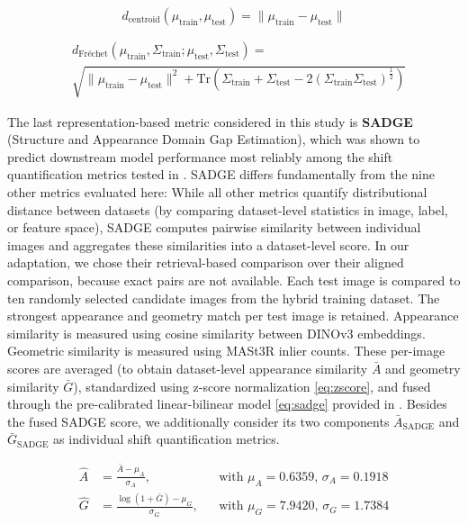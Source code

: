 \documentclass[conference]{IEEEtran}
\begin{document}
\begin{equation}
\label{eq:centroid}
d_{\text{centroid}}(\mu_{\text{train}},\mu_{\text{test}}) = \|\mu_{\text{train}} - \mu_{\text{test}}\|
\end{equation}

\begin{equation}
\label{eq:frechet}
\begin{aligned}
&d_{\text{Fréchet}}(\mu_{\text{train}},\Sigma_{\text{train}};\mu_{\text{test}},\Sigma_{\text{test}}) = \\
&\sqrt{
\|\mu_{\text{train}} - \mu_{\text{test}}\|^2
+ \mathrm{Tr}\!\left(\Sigma_{\text{train}} + \Sigma_{\text{test}} - 2(\Sigma_{\text{train}} \Sigma_{\text{test}})^{\frac{1}{2}}\right)
}
\end{aligned}
\end{equation}

\smallskip
The last representation-based metric considered in this study is \textbf{SADGE} (Structure and Appearance Domain Gap Estimation), which was shown to predict downstream model performance most reliably among the shift quantification metrics tested in \cite{bartkowiak2026}. SADGE differs fundamentally from the nine other metrics evaluated here: While all other metrics quantify distributional distance between datasets (by comparing dataset-level statistics in image, label, or feature space), SADGE computes pairwise similarity between individual images and aggregates these similarities into a dataset-level score. In our adaptation, we chose their retrieval-based comparison over their aligned comparison, because exact pairs are not available. Each test image is compared to ten randomly selected candidate images from the hybrid training dataset. The strongest appearance and geometry match per test image is retained. Appearance similarity is measured using cosine similarity between DINOv3 \cite{simeoni2025dinov3} embeddings. Geometric similarity is measured using MASt3R \cite{mast3r} inlier counts. These per-image scores are averaged (to obtain dataset-level appearance similarity $\bar{A}$ and geometry similarity $\bar{G}$), standardized using z-score normalization \eqref{eq:zscore}, and fused through the pre-calibrated linear-bilinear model \eqref{eq:sadge} provided in \cite{bartkowiak2026}. Besides the fused SADGE score, we additionally consider its two components $\bar{A}_{\text{SADGE}}$ and $\bar{G}_{\text{SADGE}}$ as individual shift quantification metrics.

\begin{equation} \label{eq:zscore}
\begin{aligned}
\hat{A} &= \frac{\bar{A} - \mu_A}{\sigma_A}, && \text{with } \mu_A = 0.6359, \, \sigma_A = 0.1918 \\
\hat{G} &= \frac{\log(1+\bar{G}) - \mu_G}{\sigma_G}, && \text{with } \mu_G = 7.9420, \, \sigma_G = 1.7384
\end{aligned}
\end{equation}
\end{document}

